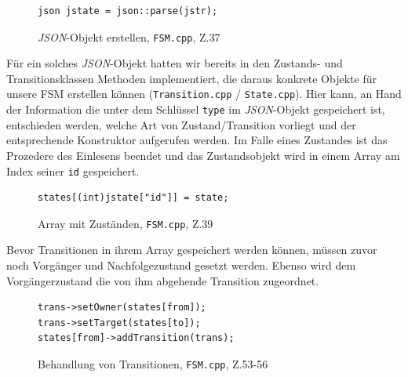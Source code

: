 \begin{figure}[thp]
\begin{lstlisting}[style=json]
json jstate = json::parse(jstr);

\end{lstlisting}

\centering
\caption{\textit{JSON}-Objekt erstellen, \texttt{FSM.cpp}, Z.37}
\end{figure}


Für ein solches \textit{JSON}-Objekt hatten wir bereits in den Zustands- und
Transitionsklassen Methoden implementiert, die daraus konkrete Objekte für unsere
FSM erstellen können (\texttt{Transition.cpp} / \texttt{State.cpp}).
Hier kann, an Hand der Information die unter dem Schlüssel \texttt{type} im \textit{JSON}-Objekt
gespeichert ist, entschieden werden, welche Art von Zustand/Transition vorliegt
und der entsprechende Konstruktor aufgerufen werden.
Im Falle eines Zustandes ist das Prozedere des Einlesens beendet und das
Zustandsobjekt wird in einem Array am Index seiner \texttt{id} gespeichert.

\begin{figure}[thp]
\begin{lstlisting}
states[(int)jstate["id"]] = state;

\end{lstlisting}
\centering
\caption{Array mit Zuständen, \texttt{FSM.cpp}, Z.39}
\end{figure}



Bevor Transitionen in ihrem Array gespeichert werden können, müssen zuvor noch
Vorgänger und Nachfolgezustand gesetzt werden. Ebenso wird dem Vorgängerzustand
die von ihm abgehende Transition zugeordnet.

\begin{figure}[thp]
\begin{lstlisting}[style=json]
trans->setOwner(states[from]);
trans->setTarget(states[to]);
states[from]->addTransition(trans);

\end{lstlisting}
\centering
\caption{Behandlung von Transitionen, \texttt{FSM.cpp}, Z.53-56}
\end{figure}

